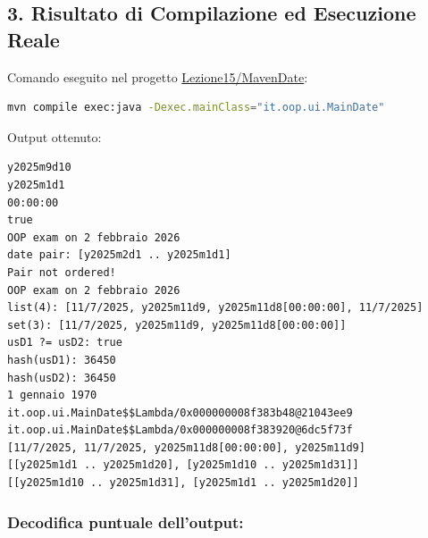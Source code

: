 \documentclass[11pt,a4paper]{article}
\begin{document}
\subsection{3. Risultato di Compilazione ed Esecuzione
Reale}\label{risultato-di-compilazione-ed-esecuzione-reale}

Comando eseguito nel progetto
\href{file:///home/wally/Documenti/GitHub/Programmazione-II/25-26/Teoria-e-Esercitazioni/Codice-20260902/Lezione15/MavenDate}{Lezione15/MavenDate}:

\begin{lstlisting}[language=bash]
mvn compile exec:java -Dexec.mainClass="it.oop.ui.MainDate"
\end{lstlisting}

Output ottenuto:

\begin{lstlisting}
y2025m9d10
y2025m1d1
00:00:00
true
OOP exam on 2 febbraio 2026
date pair: [y2025m2d1 .. y2025m1d1]
Pair not ordered!
OOP exam on 2 febbraio 2026
list(4): [11/7/2025, y2025m11d9, y2025m11d8[00:00:00], 11/7/2025]
set(3): [11/7/2025, y2025m11d9, y2025m11d8[00:00:00]]
usD1 ?= usD2: true
hash(usD1): 36450
hash(usD2): 36450
1 gennaio 1970
it.oop.ui.MainDate$$Lambda/0x000000008f383b48@21043ee9
it.oop.ui.MainDate$$Lambda/0x000000008f383920@6dc5f73f
[11/7/2025, 11/7/2025, y2025m11d8[00:00:00], y2025m11d9]
[[y2025m1d1 .. y2025m1d20], [y2025m1d10 .. y2025m1d31]]
[[y2025m1d10 .. y2025m1d31], [y2025m1d1 .. y2025m1d20]]
\end{lstlisting}

\subsubsection{Decodifica puntuale
dell'output:}\label{decodifica-puntuale-delloutput}
\end{document}

